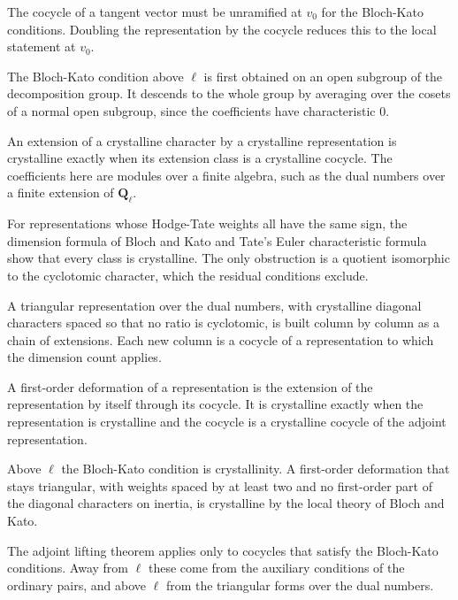 The cocycle of a tangent vector must be unramified at $v_0$ for the Bloch-Kato conditions. Doubling the representation by the cocycle reduces this to the local statement at $v_0$.

The Bloch-Kato condition above $\ell$ is first obtained on an open subgroup of the decomposition group. It descends to the whole group by averaging over the cosets of a normal open subgroup, since the coefficients have characteristic $0$.

An extension of a crystalline character by a crystalline representation is crystalline exactly when its extension class is a crystalline cocycle. The coefficients here are modules over a finite algebra, such as the dual numbers over a finite extension of $\mathbf Q_\ell$.

For representations whose Hodge-Tate weights all have the same sign, the dimension formula of Bloch and Kato and Tate's Euler characteristic formula show that every class is crystalline. The only obstruction is a quotient isomorphic to the cyclotomic character, which the residual conditions exclude.

A triangular representation over the dual numbers, with crystalline diagonal characters spaced so that no ratio is cyclotomic, is built column by column as a chain of extensions. Each new column is a cocycle of a representation to which the dimension count applies.

A first-order deformation of a representation is the extension of the representation by itself through its cocycle. It is crystalline exactly when the representation is crystalline and the cocycle is a crystalline cocycle of the adjoint representation.

Above $\ell$ the Bloch-Kato condition is crystallinity. A first-order deformation that stays triangular, with weights spaced by at least two and no first-order part of the diagonal characters on inertia, is crystalline by the local theory of Bloch and Kato.

The adjoint lifting theorem applies only to cocycles that satisfy the Bloch-Kato conditions. Away from $\ell$ these come from the auxiliary conditions of the ordinary pairs, and above $\ell$ from the triangular forms over the dual numbers.

